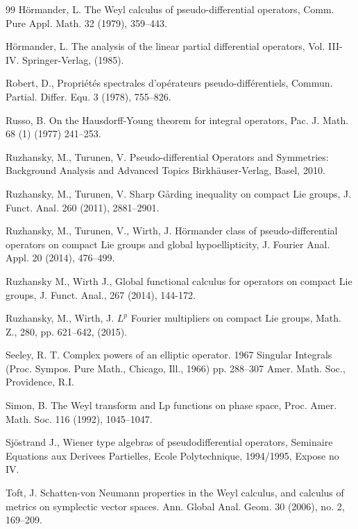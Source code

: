 \documentclass[12pt, reqno]{amsart}
\theoremstyle{definition}
\theoremstyle{remark}
\numberwithin{equation}{section}
\begin{document}
\begin{thebibliography}{99}
 H\"ormander, L. The Weyl calculus of pseudo-differential operators, Comm. Pure Appl. Math.
32 (1979), 359--443.


   H\"ormander, L. { The analysis of the linear partial differential operators,} Vol. III-IV. Springer-Verlag, (1985).


 Robert, D., Propri\'et\'es spectrales d'op\'erateurs pseudo-diff\'erentiels, Commun. Partial. Differ. Equ.  3 (1978), 755--826. 


 Russo, B. On the Hausdorff-Young theorem for integral operators, Pac. J. Math. 68 (1) (1977) 241–253.

  Ruzhansky, M.,  Turunen, V. {Pseudo-differential Operators and Symmetries: Background Analysis and Advanced Topics } Birkh\"auser-Verlag, Basel, 2010.

 Ruzhansky, M., Turunen, V. { Sharp G\r{a}rding inequality on compact Lie groups,} J. Funct. Anal. 260 (2011), 2881--2901.

 Ruzhansky, M.,  Turunen, V., Wirth, J.  H\"ormander class of pseudo-differential operators on compact Lie groups and global hypoellipticity, J. Fourier Anal. Appl. 20  (2014), 476--499.

 Ruzhansky M., Wirth J., Global functional calculus for operators on compact Lie groups, J. Funct. Anal., 267 (2014), 144-172. 


 Ruzhansky, M., Wirth, J. $L^p$ Fourier multipliers on compact Lie groups, Math. Z., 280, pp. 621--642, (2015).


  Seeley, R. T. Complex powers of an elliptic operator. 1967 Singular Integrals (Proc. Sympos. Pure Math., Chicago, Ill., 1966) pp. 288–307 Amer. Math. Soc., Providence, R.I.

 Simon, B. The Weyl transform and Lp functions on phase space, Proc. Amer. Math.
Soc. 116 (1992), 1045--1047.

 Sj\"ostrand J., Wiener type algebras of pseudodifferential operators, Seminaire Equations aux Derivees Partielles, Ecole Polytechnique, 1994/1995, Expose no IV.

 Toft, J. Schatten-von Neumann properties in the Weyl calculus, and calculus of metrics on symplectic vector spaces. Ann. Global Anal. Geom. 30 (2006), no. 2, 169--209.


\end{thebibliography}
\end{document}
